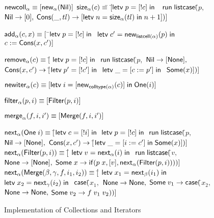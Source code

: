 \begin{figure}
\mbox{}
\begin{specification}
$\mathsf{newcoll}_\alpha \equiv [\mathsf{new}_{\alpha}(\mathsf{Nil})]$ 
$\mathsf{size}_\alpha(c) \equiv $\=
         $[$\=$\mathsf{letv}\;p = [!c]\;\mathsf{in}\;$ 
\nextline\> \>$\;
               \mathsf{run}\; \mathsf{listcase}($\=$p,$ 
\nextline\> \>                   \>$\mathsf{Nil} \to [0],$
\nextline\> \>                   \>$\mathsf{Cons}(\_, tl) \to 
                                     [\mathsf{letv}\;n = \mathsf{size}_\alpha(tl)\;\mathsf{in}\;n+1])]$

$\mathsf{add}_\alpha(c, x) \equiv [$
          \=$\mathsf{letv}\;p = [!c]\;\mathsf{in}\;$ 
\nextline \>$\mathsf{letv}\;c' = \mathsf{new}_{\mathsf{listcell}(\alpha)}(p)\;\mathsf{in}\;$ 
\nextline \>$c := \mathsf{Cons}(x, c')]$ 

$\mathsf{remove}_\alpha(c) \equiv [$\=
            $\mathsf{letv}\;p = [!c]\;\mathsf{in}\;$ 
\nextline \>$\mathsf{run}\;\mathsf{listcase}($\=$p,$ 
\nextline \>                                \>$\mathsf{Nil} \to [\mathsf{None}],$ 
\nextline \>                                \>$\mathsf{Cons}(x, c') \to [$\=$\mathsf{letv}\;p' = [!c']\;\mathsf{in}\;$ 
\nextline \>                                \> \>$\mathsf{letv}\;\_ = [c := p']\;\mathsf{in}\;$ 
\nextline \>                                \> \>$\mathsf{Some}(x)])]$

$\mathsf{newiter}_\alpha(c) \equiv [\mathsf{letv}\;i = [\mathsf{new}_{\mathsf{colltype}(\alpha)}(c)]\;\mathsf{in}\;\mathsf{One}(i)]$

$\mathsf{filter}_\alpha(p, i) \equiv [\mathsf{Filter}(p, i)]$

$\mathsf{merge}_\alpha(f, i, i') \equiv [\mathsf{Merge}(f, i, i')]$ 

$\mathsf{next}_\alpha(\mathsf{One}\;i) \equiv [$\=$\mathsf{letv}\;c = [!i]\;\mathsf{in}\;$ 
\nextline \> $\mathsf{letv}\;p = [!c]\;\mathsf{in}\;$ 
\nextline \> $\mathsf{run}\;\mathsf{listcase}($\=$p,$ 
\nextline \>                                  \>$\mathsf{Nil} \to [\mathsf{None}],$ 
\nextline \>                                  \>$\mathsf{Cons}(x, c') \to [$\=$\mathsf{letv}\;\_ = [i := c']\;\mathsf{in}\;\mathsf{Some}(x)])]$ 
$\mathsf{next}_\alpha(\mathsf{Filter}(p, i)) \equiv [$\= 
           $\letv{v}{\nextiter_\alpha(i)}$ 
\nextline\>$\mathsf{run}\;\mathsf{listcase}($\=$v,$ 
\nextline\>\> $\mathsf{None} \to [\mathsf{None}],$ 
\nextline\>\> $\mathsf{Some}\;x \to \mathsf{if}({p\;x}, {[v]}, {\mathsf{next}_\alpha(\mathsf{Filter}(p,i))}))]$ 
$\mathsf{next}_\alpha(\mathsf{Merge}(\beta, \gamma, f, i_1, i_2)) \equiv [$\=
            $\mathsf{letv}\;x_1 = \mathsf{next}_\beta(i_1)\;\mathsf{in}\;$ 
\nextline\> $\mathsf{letv}\;x_2 = \mathsf{next}_\gamma(i_2)\;\mathsf{in}\;$ 
\nextline\> $\mathsf{case}($\=$x_1,$ 
\nextline\> \>           $\mathsf{None} \to \mathsf{None},$ 
\nextline\> \>           $\mathsf{Some}\;v_1 \to \mathsf{case}($\=$x_2,$ 
\nextline\> \> \>                                 $\mathsf{None} \to \mathsf{None},$
\> \> \>                                 $\mathsf{Some}\;v_2 \to f\;v_1\;v_2))]$
                                                   
\end{specification}
\caption{Implementation of Collections and Iterators}
\label{iterator-implementation}
\end{figure}


